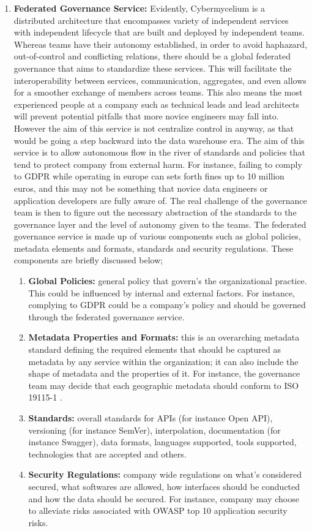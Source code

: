 \documentclass{bmcart}
\begin{document}
\begin{enumerate}
    
    \item  \textbf{Federated Governance Service:} Evidently, Cybermycelium is a distributed architecture that encompasses variety of independent services with independent lifecycle that are built and deployed by independent teams. Whereas teams have their autonomy established, in order to avoid haphazard, out-of-control and conflicting relations, there should be a global federated governance that aims to standardize these services. This will facilitate the interoperability between services, communication, aggregates, and even allows for a smoother exchange of members across teams. This also means the most experienced people at a company such as technical leads and lead architects will prevent potential pitfalls that more novice engineers may fall into. However the aim of this service is not centralize control in anyway, as that would be going a step backward into the data warehouse era. The aim of this service is to allow autonomous flow in the river of standards and policies that tend to protect company from external harm. For instance, failing to comply to GDPR while operating in europe can sets forth fines up to 10 million euros, and this may not be something that novice data engineers or application developers are fully aware of. The real challenge of the governance team is then to figure out the necessary abstraction of the standards to the governance layer and the level of autonomy given to the teams. The federated governance service is made up of various components such as global policies, metadata elements and formats, standards and security regulations. These components are briefly discussed below;
    \begin{enumerate}
        \item \textbf{Global Policies:} general policy that govern's the organizational practice. This could be influenced by internal and external factors. For instance, complying to GDPR could be a company's policy and should be governed through the federated governance service.
        \item \textbf{Metadata Properties and Formats:} this is an overarching metadata standard defining the required elements that should be captured as metadata by any service within the organization; it can also include the shape of metadata and the properties of it. For instance, the governance team may decide that each geographic metadata should conform to ISO 19115-1 \cite{ISOMetadata}.
        \item \textbf{Standards:} overall standards for APIs (for instance Open API), versioning (for instance SemVer), interpolation, documentation (for instance Swagger), data formats, languages supported, tools supported, technologies that are accepted and others.
        \item \textbf{Security Regulations:} company wide regulations on what's considered secured, what softwares are allowed, how interfaces should be conducted and how the data should be secured. For instance, company may choose to alleviate risks associated with OWASP top 10 application security risks.
    \end{enumerate}


\end{enumerate}
\end{document}
